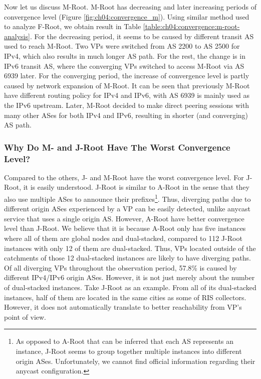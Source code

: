 Now let us discuss M-Root. M-Root has decreasing and later increasing periods of convergence level (Figure \ref{fig:ch04:convergence_m}). Using similar method used to analyze F-Root, we obtain result in Table \ref{table:ch04:convergence:m-root-analysis}. For the decreasing period, it seems to be caused by different transit AS used to reach M-Root. Two VPs were switched from AS 2200 to AS 2500 for IPv4, which also results in much longer AS path. For the rest, the change is in IPv6 transit AS, where the converging VPs switched to access M-Root via AS 6939 later. For the converging period, the increase of convergence level is partly caused by network expansion of M-Root. It can be seen that previously M-Root have different routing policy for IPv4 and IPv6, with AS 6939 is mainly used as the IPv6 upstream. Later, M-Root decided to make direct peering sessions with many other ASes for both IPv4 and IPv6, resulting in shorter (and converging) AS path. 

\subsubsection{Why Do M- and J-Root Have The Worst Convergence Level?}

Compared to the others, J- and M-Root have the worst convergence level. For J-Root, it is easily understood. J-Root is similar to A-Root in the sense that they also use multiple ASes to announce their prefixes\footnote{As opposed to A-Root that can be inferred that each AS represents an instance, J-Root seems to group together multiple instances into different origin ASes. Unfortunately, we cannot find official information regarding their anycast configuration.}. Thus, diverging paths due to different origin ASes experienced by a VP can be easily detected, unlike anycast service that uses a single origin AS. However, A-Root have better convergence level than J-Root. We believe that it is because A-Root only has five instances where all of them are global nodes and dual-stacked, compared to 112 J-Root instances with only 12 of them are dual-stacked. Thus, VPs located outside of the catchments of those 12 dual-stacked instances are likely to have diverging paths. Of all diverging VPs throughout the observation period, 57.8\% is caused by different IPv4/IPv6 origin ASes. However, it is not just merely about the number of dual-stacked instances. Take J-Root as an example. From all of its dual-stacked instances, half of them are located in the same cities as some of RIS collectors. However, it does not automatically translate to better reachability from VP's point of view. %

